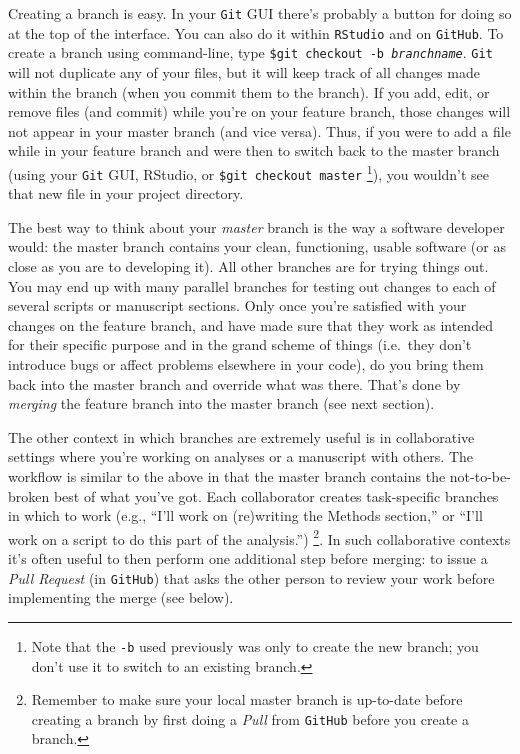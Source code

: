 \documentclass[12pt,letterpaper]{article}
\begin{document}
Creating a branch is easy.
In your \texttt{Git} GUI there's probably a button for doing so at the top of 
the interface.
You can also do it within \texttt{RStudio} and on \texttt{GitHub}.
To create a branch using command-line,
type \texttt{\$git checkout -b \emph{branchname}}.
\texttt{Git} will not duplicate any of your files, 
but it will keep track of all changes made within the branch
(when you commit them to the branch).
If you add, edit, or remove files (and commit) while you're on your feature 
branch, 
those changes will not appear in your master branch (and vice versa).
Thus, if you were to add a file while in your feature branch and were then to 
switch back to the master branch (using your \texttt{Git} GUI, RStudio, or 
\texttt{\$git checkout master}
\unskip
\footnote{Note that the \texttt{-b} used previously was only to create the new 
	branch; you don't use it to switch to an existing branch.}), 
you wouldn't see that new file in your project directory.

The best way to think about your \emph{master} branch is the way a software developer would:
the master branch contains your clean, functioning, usable software
(or as close as you are to developing it).
All other branches are for trying things out.
You may end up with many parallel branches
for testing out changes to each of several scripts or manuscript sections.
Only once you're satisfied with your changes on the feature branch, 
and have made sure that they work as intended for their specific purpose and in 
the grand scheme of things
(i.e.~they don't introduce bugs or affect problems elsewhere in your code), 
do you bring them back into the master branch and override what was there.
That's done by \emph{merging} the feature branch into the master branch (see next section).

The other context in which branches are extremely useful is in collaborative settings where you're working on analyses or a manuscript with others.
The workflow is similar to the above in that the master branch contains the not-to-be-broken best of what you've got.
Each collaborator creates task-specific branches in which to work
(e.g., ``I'll work on (re)writing the Methods section,'' 
or ``I'll work on a script to do this part of the analysis.'')
\unskip
\footnote{Remember to make sure your local master branch is up-to-date 
	before creating a branch by first doing a \emph{Pull} from \texttt{GitHub} 
	before you create a branch.}.
In such collaborative contexts it's often useful to then perform one additional 
step before merging:  
to issue a \emph{Pull Request} (in \texttt{GitHub}) that asks the other person to 
review your work before implementing the merge (see below).
\end{document}
